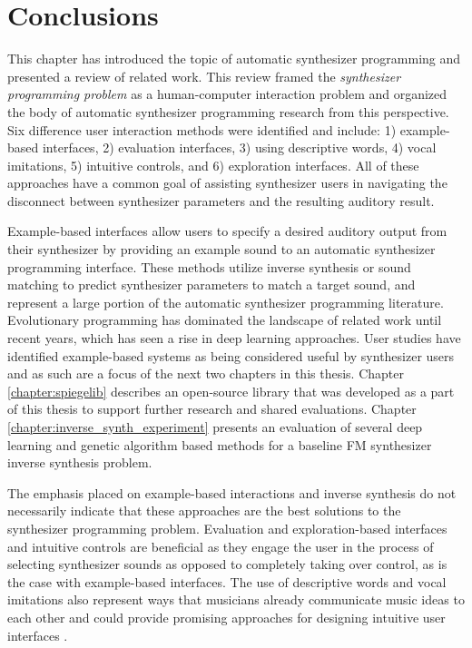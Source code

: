  

\section{Conclusions}
This chapter has introduced the topic of automatic synthesizer programming and presented a review of related work. This review framed the \textit{synthesizer programming problem} as a human-computer interaction problem and organized the body of automatic synthesizer programming research from this perspective. Six difference user interaction methods were identified and include: 1) example-based interfaces, 2) evaluation interfaces, 3) using descriptive words, 4) vocal imitations, 5) intuitive controls, and 6) exploration interfaces. All of these approaches have a common goal of assisting synthesizer users in navigating the disconnect between synthesizer parameters and the resulting auditory result.

Example-based interfaces allow users to specify a desired auditory output from their synthesizer by providing an example sound to an automatic synthesizer programming interface. These methods utilize inverse synthesis or sound matching to predict synthesizer parameters to match a target sound, and represent a large portion of the automatic synthesizer programming literature. Evolutionary programming has dominated the landscape of related work until recent years, which has seen a rise in deep learning approaches. User studies have identified example-based systems as being considered useful by synthesizer users \cite{krekovic2019insights} and as such are a focus of the next two chapters in this thesis. Chapter \ref{chapter:spiegelib} describes an open-source library that was developed as a part of this thesis to support further research and shared evaluations. Chapter \ref{chapter:inverse_synth_experiment} presents an evaluation of several deep learning and genetic algorithm based methods for a baseline FM synthesizer inverse synthesis problem.

The emphasis placed on example-based interactions and inverse synthesis do not necessarily indicate that these approaches are the best solutions to the synthesizer programming problem. Evaluation and exploration-based interfaces and intuitive controls are beneficial as they engage the user in the process of selecting synthesizer sounds as opposed to completely taking over control, as is the case with example-based interfaces. The use of descriptive words and vocal imitations also represent ways that musicians already communicate music ideas to each other and could provide promising approaches for designing intuitive user interfaces \cite{pardo2019learning}. 

